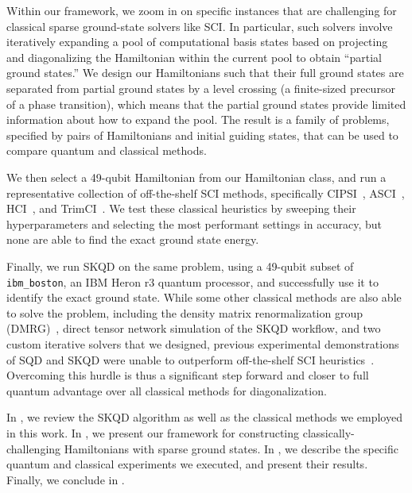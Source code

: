 \documentclass[
  reprint,            %
  amsmath,amssymb,
  aps,
  superscriptaddress, %
  longbibliography
]{revtex4-2}
\theoremstyle{definition}
\begin{document}
Within our framework, we zoom in on specific instances that are challenging for classical sparse ground-state solvers like SCI.
In particular, such solvers involve iteratively expanding a pool of computational basis states based on projecting and diagonalizing the Hamiltonian within the current pool to obtain ``partial ground states.''
We design our Hamiltonians such that their full ground states are separated from partial ground states by a level crossing (a finite-sized precursor of a phase transition), which means that the partial ground states provide limited information about how to expand the pool.
The result is a family of problems, specified by pairs of Hamiltonians and initial guiding states, that can be used to compare quantum and classical methods.

We then select a 49-qubit Hamiltonian from our Hamiltonian class, and run a representative collection of off-the-shelf SCI methods, specifically CIPSI~\cite{Huron_1973_CIPSI}, ASCI~\cite{tubman2016deterministic_SCI}, HCI~\cite{holmes2016heat_SCI, sharma2017semistochastic_SCI, holmes2016efficient_SCI}, and TrimCI~\cite{zhang2025TrimCI_SCI}. We test these classical heuristics by sweeping their hyperparameters and selecting the most performant settings in accuracy, but none are able to find the exact ground state energy.

Finally, we run SKQD on the same problem, using a 49-qubit subset of \texttt{ibm\_boston}, an IBM Heron r3 quantum processor, and successfully use it to identify the exact ground state.
While some other classical methods are also able to solve the problem, including the density matrix renormalization group (DMRG)~\cite{white1992dmrg,chan2002dmrg}, direct tensor network simulation of the SKQD workflow, and two custom iterative solvers that we designed, previous experimental demonstrations of SQD and SKQD were unable to outperform off-the-shelf SCI heuristics~\cite{holmes2016heat_SCI, holmes2016efficient_SCI, tubman2016deterministic_SCI, Huron_1973_CIPSI, sharma2017semistochastic_SCI, zhang2025TrimCI_SCI}. 
Overcoming this hurdle is thus a significant step forward and closer to full quantum advantage over all classical methods for diagonalization.

In , we review the SKQD algorithm as well as the classical methods we employed in this work.
In , we present our framework for constructing classically-challenging Hamiltonians with sparse ground states.
In , we describe the specific quantum and classical experiments we executed, and present their results.
Finally, we conclude in .
\end{document}
